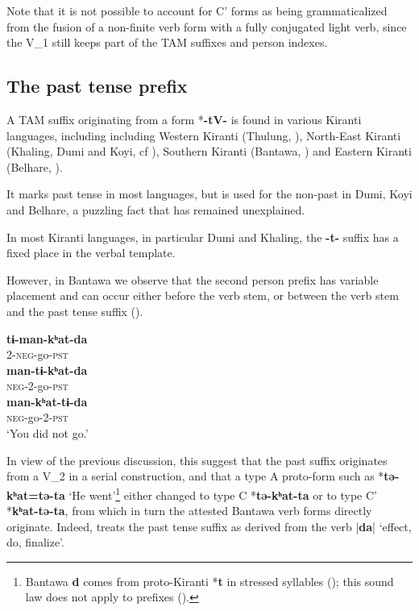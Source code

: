 \documentclass[11pt]{article}
\newcommand{\ipa}[1]{{\phon\textbf{#1}}}
\newcommand{\dhatu}[2]{|\ipa{#1}| `#2'}
\begin{document}
Note that it is not possible to account for C' forms as being grammaticalized from the fusion of a non-finite verb form with a fully conjugated light verb, since the V_1 still keeps part of the TAM suffixes and person indexes.



\subsection{The past tense prefix} \label{sec:pst}
A TAM suffix originating from a form *\ipa{-tV-} is found in various Kiranti languages, including including Western Kiranti (Thulung, \citealt{lahaussois03}), North-East Kiranti (Khaling, Dumi and Koyi, cf \citealt{driem93dumi, lahaussois09, jacques12khaling}), Southern Kiranti (Bantawa, \citealt{doornenbal09}) and Eastern Kiranti (Belhare, \citealt[551]{bickel03belhare}).

It marks past tense in most languages, but is used for the non-past in Dumi, Koyi and Belhare, a puzzling fact that has remained unexplained.

In most Kiranti languages, in particular Dumi and Khaling, the \ipa{-t-} suffix has a fixed place in the verbal template. 

However, in Bantawa we observe that the second person prefix has variable placement and can occur either before the verb stem, or between the verb stem and the past tense suffix (\citealt[171]{doornenbal09}).

\begin{exe}
\ex \label{ex:timankhatda}
\gll 
\ipa{tɨ-man-kʰat-da} \\
2-\textsc{neg}-go-\textsc{pst} \\
\ex
\gll 
\ipa{man-tɨ-kʰat-da} \\
\textsc{neg}-2-go-\textsc{pst} \\
\ex 
\gll 
\ipa{man-kʰat-tɨ-da} \\
\textsc{neg}-go-2-\textsc{pst} \\
\glt `You did not go.'
\end{exe}

In view of the previous discussion, this suggest that the past suffix originates from a V_2 in a serial construction, and that a type A proto-form such as *\ipa{tə-kʰat=tə-ta} `He went'\footnote{Bantawa \ipa{d} comes from proto-Kiranti *\ipa{t} in stressed syllables (\citealt{michailovsky94stops}); this sound law does not apply to prefixes (\citealt{jacques12agreement}).} either changed to type C *\ipa{tə-kʰat-ta} or to type C' *\ipa{kʰat-tə-ta}, from which in turn the attested Bantawa verb forms directly originate. Indeed, \citet[165;272]{doornenbal09} treats the past tense suffix as derived from the verb \dhatu{da}{effect, do, finalize}.
\end{document}
